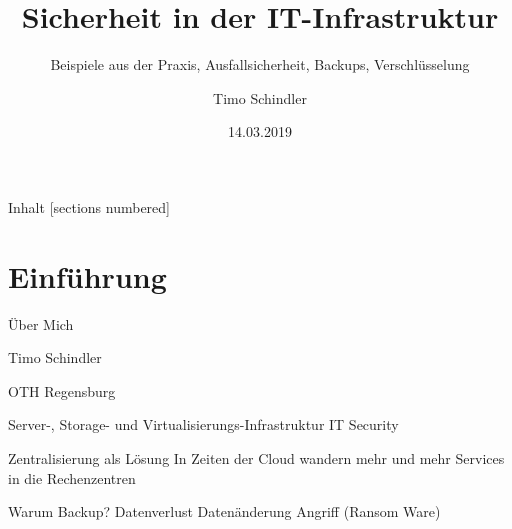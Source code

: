 \documentclass[10pt]{beamer}
\title{Sicherheit in der IT-Infrastruktur}
\subtitle{Beispiele aus der Praxis, Ausfallsicherheit, Backups, Verschlüsselung}
\date{14.03.2019}
\author{Timo Schindler}
\institute{OTH Regensburg}
\begin{document}
\maketitle

\begin{frame}{Inhalt}
  [sections numbered]
  \tableofcontents[hideallsubsections]
\end{frame}

\section{Einführung}

\begin{frame}[fragile]{Über Mich}

  Timo Schindler
  
  OTH Regensburg
  
  Server-, Storage- und Virtualisierungs-Infrastruktur 
  IT Security
  
\end{frame}


\begin{frame}[fragile]{Zentralisierung als Lösung}
In Zeiten der Cloud wandern mehr und mehr Services in die Rechenzentren
\end{frame}

\begin{frame}[fragile]{Warum Backup?}
Datenverlust
Datenänderung
Angriff (Ransom Ware)
\end{frame}
\end{document}
